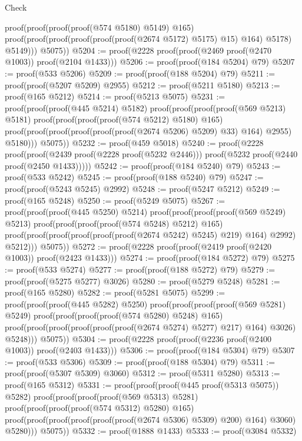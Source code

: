 \begin{lexlean}{Check}
\begin{coremodule}
            proof(proof(proof(proof(@574 @5180) @5149) @165)
                proof(proof(proof(proof(proof(proof(@2674 @5172) @5175) @15) @164) @5178) @5149)))
          @5075))
@5204 := proof(@2228 proof(proof(@2469 proof(@2470 @1003)) proof(@2104 @1433)))
@5206 := proof(proof(@184 @5204) @79)
@5207 := proof(@533 @5206)
@5209 := proof(proof(@188 @5204) @79)
@5211 := proof(proof(@5207 @5209) @2955)
@5212 := proof(@5211 @5180)
@5213 := proof(@165 @5212)
@5214 := proof(@5213 @5075)
@5231 := proof(proof(proof(@445 @5214) @5182)
      proof(proof(proof(proof(@569 @5213) @5181)
            proof(proof(proof(proof(@574 @5212) @5180) @165)
                proof(proof(proof(proof(proof(proof(@2674 @5206) @5209) @33) @164) @2955) @5180)))
          @5075))
@5232 := proof(@459 @5018)
@5240 := proof(@2228
      proof(proof(@2439 proof(@2228 proof(@5232 @2446)))
          proof(@5232 proof(@2440 proof(@2450 @1433)))))
@5242 := proof(proof(@184 @5240) @79)
@5243 := proof(@533 @5242)
@5245 := proof(proof(@188 @5240) @79)
@5247 := proof(proof(@5243 @5245) @2992)
@5248 := proof(@5247 @5212)
@5249 := proof(@165 @5248)
@5250 := proof(@5249 @5075)
@5267 := proof(proof(proof(@445 @5250) @5214)
      proof(proof(proof(proof(@569 @5249) @5213)
            proof(proof(proof(proof(@574 @5248) @5212) @165)
                proof(proof(proof(proof(proof(proof(@2674 @5242) @5245) @219) @164) @2992) @5212)))
          @5075))
@5272 := proof(@2228 proof(proof(@2419 proof(@2420 @1003)) proof(@2423 @1433)))
@5274 := proof(proof(@184 @5272) @79)
@5275 := proof(@533 @5274)
@5277 := proof(proof(@188 @5272) @79)
@5279 := proof(proof(@5275 @5277) @3026)
@5280 := proof(@5279 @5248)
@5281 := proof(@165 @5280)
@5282 := proof(@5281 @5075)
@5299 := proof(proof(proof(@445 @5282) @5250)
      proof(proof(proof(proof(@569 @5281) @5249)
            proof(proof(proof(proof(@574 @5280) @5248) @165)
                proof(proof(proof(proof(proof(proof(@2674 @5274) @5277) @217) @164) @3026) @5248)))
          @5075))
@5304 := proof(@2228 proof(proof(@2236 proof(@2400 @1003)) proof(@2403 @1433)))
@5306 := proof(proof(@184 @5304) @79)
@5307 := proof(@533 @5306)
@5309 := proof(proof(@188 @5304) @79)
@5311 := proof(proof(@5307 @5309) @3060)
@5312 := proof(@5311 @5280)
@5313 := proof(@165 @5312)
@5331 := proof(proof(proof(@445 proof(@5313 @5075)) @5282)
      proof(proof(proof(proof(@569 @5313) @5281)
            proof(proof(proof(proof(@574 @5312) @5280) @165)
                proof(proof(proof(proof(proof(proof(@2674 @5306) @5309) @200) @164) @3060) @5280)))
          @5075))
@5332 := proof(@1888 @1433)
@5333 := proof(@3084 @5332)

\end{coremodule}
\end{lexlean}
